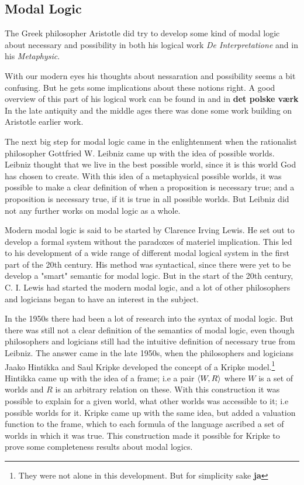 \documentclass[../main.tex]{subfiles}
\begin{document}
\subsection{Modal Logic}
The Greek philosopher Aristotle did try to develop some kind of modal logic
about necessary and possibility in both his logical work \textit{De
Interpretatione} and in his
 \textit{Metaphysic}.

With our modern eyes his thoughts about nessaration and possibility seems a
bit confusing. But he gets some implications about these notions right. A good
overview of this part of his logical work can be found in \cite{Lemmon1977} and
in \textbf{det polske værk}
In the late antiquity and the middle ages there was done some work building on 
Aristotle earlier work. 

The next big step for modal logic came in the enlightenment when the
rationalist philosopher Gottfried W. Leibniz came up with the idea of possible
worlds.  Leibniz thought that we live in the best possible world, since it is
this world God has chosen to create. With this idea of a metaphysical possible
worlds, it was possible to make a clear definition of when a proposition is
necessary true; and a proposition is necessary true, if it is true in all
possible worlds. But Leibniz did not any further works on modal logic as a
whole.

Modern modal logic is said to be started by Clarence Irving Lewis. He set out
to develop a formal system without the paradoxes of materiel
implication. This led to his development of a wide range of different modal
logical system in the first part of the 20th century. His method was
syntactical, since there were yet to be develop a "smart" semantic for modal
logic. But in the start of the 20th century, C. I. Lewis had started the modern
modal logic, and a lot of other philosophers and logicians began to have an
interest in the subject.


In the 1950s there had been a lot of research into the syntax of modal logic.
But there was still not a clear definition of the semantics of modal logic,
even though philosophers and logicians still had the intuitive definition of
necessary true from Leibniz. The answer came in the late 1950s, when the
philosophers and logicians Jaako Hintikka
and Saul Kripke developed the concept of a Kripke model.\footnote{They were not
	alone in this development. But for simplicity sake \textbf{ja}}
Hintikka came up with the idea of a frame; i.e a pair $\langle W,R\rangle$ where $W$ is
a set of worlds and $R$ is an arbitrary relation on these. With this
construction it was possible to explain for a given world, what other worlds
was accessible to it; i.e possible worlds for it. Kripke came up with the same
idea, but added a valuation function to the frame, which to each formula of the
language ascribed a set of worlds in which it was true.  This construction made
it possible for Kripke to prove some completeness results about modal logics.
\end{document}
